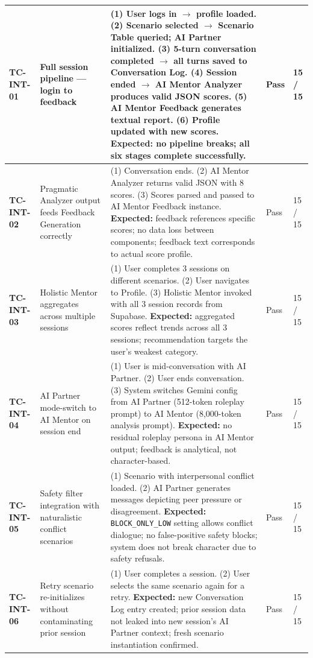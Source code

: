 \begin{longtable}{>{\bfseries}p{1.4cm} p{3.2cm} p{6.5cm} p{1.0cm} p{1.5cm}}
\midrule
TC-INT-01 & Full session pipeline --- login to feedback &
(1) User logs in $\rightarrow$ profile loaded. (2) Scenario selected $\rightarrow$ Scenario Table queried; AI Partner initialized. (3) 5-turn conversation completed $\rightarrow$ all turns saved to Conversation Log. (4) Session ended $\rightarrow$ AI Mentor Analyzer produces valid JSON scores. (5) AI Mentor Feedback generates textual report. (6) Profile updated with new scores. \textbf{Expected:} no pipeline breaks; all six stages complete successfully. & Pass & 15 / 15 \\
\midrule
TC-INT-02 & Pragmatic Analyzer output feeds Feedback Generation correctly &
(1) Conversation ends. (2) AI Mentor Analyzer returns valid JSON with 8 scores. (3) Scores parsed and passed to AI Mentor Feedback instance. \textbf{Expected:} feedback references specific scores; no data loss between components; feedback text corresponds to actual score profile. & Pass & 15 / 15 \\
\midrule
TC-INT-03 & Holistic Mentor aggregates across multiple sessions &
(1) User completes 3 sessions on different scenarios. (2) User navigates to Profile. (3) Holistic Mentor invoked with all 3 session records from Supabase. \textbf{Expected:} aggregated scores reflect trends across all 3 sessions; recommendation targets the user's weakest category. & Pass & 15 / 15 \\
\midrule
TC-INT-04 & AI Partner mode-switch to AI Mentor on session end &
(1) User is mid-conversation with AI Partner. (2) User ends conversation. (3) System switches Gemini config from AI Partner (512-token roleplay prompt) to AI Mentor (8,000-token analysis prompt). \textbf{Expected:} no residual roleplay persona in AI Mentor output; feedback is analytical, not character-based. & Pass & 15 / 15 \\
\midrule
TC-INT-05 & Safety filter integration with naturalistic conflict scenarios &
(1) Scenario with interpersonal conflict loaded. (2) AI Partner generates messages depicting peer pressure or disagreement. \textbf{Expected:} \texttt{BLOCK\_ONLY\_LOW} setting allows conflict dialogue; no false-positive safety blocks; system does not break character due to safety refusals. & Pass & 15 / 15 \\
\midrule
TC-INT-06 & Retry scenario re-initializes without contaminating prior session &
(1) User completes a session. (2) User selects the same scenario again for a retry. \textbf{Expected:} new Conversation Log entry created; prior session data not leaked into new session's AI Partner context; fresh scenario instantiation confirmed. & Pass & 15 / 15 \\
\bottomrule
\end{longtable}

